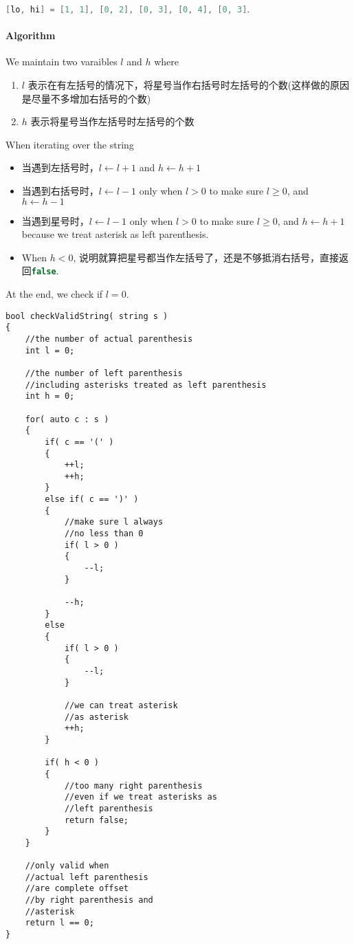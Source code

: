 \lstinline[language=Java, basicstyle=\small\ttfamily, keywordstyle=\bfseries\color{green!40!black}]|[lo, hi] = [1, 1], [0, 2], [0, 3], [0, 4], [0, 3]|.

\paragraph{Algorithm}

We maintain two varaibles $l$ and $h$ where 

\begin{enumerate}
\item $l$ 表示在有左括号的情况下，将星号当作右括号时左括号的个数(这样做的原因是尽量不多增加右括号的个数)
\item $h$ 表示将星号当作左括号时左括号的个数
\end{enumerate}

When iterating over the string
\begin{itemize}
\item 当遇到左括号时，$l\gets l+1$ and $h\gets h+1$
\item 当遇到右括号时，$l\gets l-1$ only when $l >0$ to make sure $l\geq 0$, and $h\gets h-1$
\item 当遇到星号时，$l\gets l-1$ only when $l >0$ to make sure $l\geq 0$, and $h\gets h+1$ because we treat asterisk as left parenthesis.
\item When $h<0$, 说明就算把星号都当作左括号了，还是不够抵消右括号，直接返回\lstinline[language=C++, basicstyle=\small\ttfamily, keywordstyle=\bfseries\color{green!40!black}]|false|.
\end{itemize}

At the end, we check if $l=0$.

\setcounter{lstlisting}{0}
\begin{lstlisting}[style=customc, caption={Greedy}]
bool checkValidString( string s )
{
    //the number of actual parenthesis
    int l = 0;

    //the number of left parenthesis
    //including asterisks treated as left parenthesis
    int h = 0;

    for( auto c : s )
    {
        if( c == '(' )
        {
            ++l;
            ++h;
        }
        else if( c == ')' )
        {
            //make sure l always
            //no less than 0
            if( l > 0 )
            {
                --l;
            }

            --h;
        }
        else
        {
            if( l > 0 )
            {
                --l;
            }

            //we can treat asterisk
            //as asterisk
            ++h;
        }

        if( h < 0 )
        {
            //too many right parenthesis
            //even if we treat asterisks as
            //left parenthesis
            return false;
        }
    }

    //only valid when
    //actual left parenthesis
    //are complete offset
    //by right parenthesis and
    //asterisk
    return l == 0;
}
\end{lstlisting}


